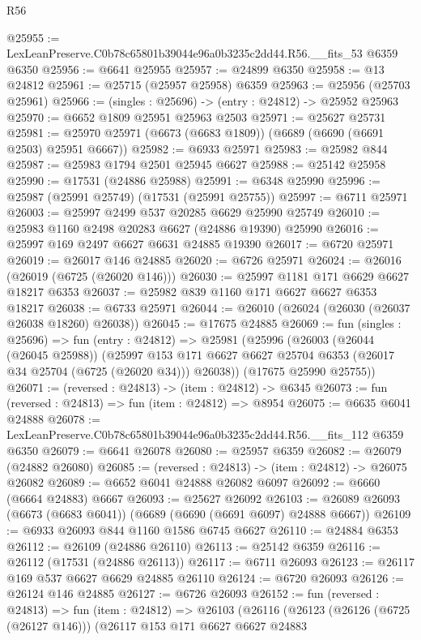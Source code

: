 \begin{lexlean}{R56}
\begin{coremodule}
@25955 := LexLeanPreserve.C0b78c65801b39044e96a0b3235c2dd44.R56.__fits_53 @6359 @6350
@25956 := @6641 @25955
@25957 := @24899 @6350
@25958 := @13 @24812
@25961 := @25715 (@25957 @25958) @6359
@25963 := @25956 (@25703 @25961)
@25966 := (singles : @25696) -> (entry : @24812) -> @25952 @25963
@25970 := @6652 @1809 @25951 @25963 @2503
@25971 := @25627 @25731
@25981 := @25970 @25971 (@6673 (@6683 @1809)) (@6689 (@6690 (@6691 @2503) @25951 @6667))
@25982 := @6933 @25971
@25983 := @25982 @844
@25987 := @25983 @1794 @2501 @25945 @6627
@25988 := @25142 @25958
@25990 := @17531 (@24886 @25988)
@25991 := @6348 @25990
@25996 := @25987 (@25991 @25749) (@17531 (@25991 @25755))
@25997 := @6711 @25971
@26003 := @25997 @2499 @537 @20285 @6629 @25990 @25749
@26010 := @25983 @1160 @2498 @20283 @6627 (@24886 @19390) @25990
@26016 := @25997 @169 @2497 @6627 @6631 @24885 @19390
@26017 := @6720 @25971
@26019 := @26017 @146 @24885
@26020 := @6726 @25971
@26024 := @26016 (@26019 (@6725 (@26020 @146)))
@26030 := @25997 @1181 @171 @6629 @6627 @18217 @6353
@26037 := @25982 @839 @1160 @171 @6627 @6627 @6353 @18217
@26038 := @6733 @25971
@26044 := @26010 (@26024 (@26030 (@26037 @26038 @18260) @26038))
@26045 := @17675 @24885
@26069 := fun (singles : @25696) =>
  fun (entry : @24812) =>
  @25981
    (@25996
      (@26003
        (@26044 (@26045 @25988))
        (@25997 @153 @171 @6627 @6627 @25704 @6353 (@26017 @34 @25704 (@6725 (@26020 @34))) @26038))
      (@17675 @25990 @25755))
@26071 := (reversed : @24813) -> (item : @24812) -> @6345
@26073 := fun (reversed : @24813) => fun (item : @24812) => @8954
@26075 := @6635 @6041 @24888
@26078 := LexLeanPreserve.C0b78c65801b39044e96a0b3235c2dd44.R56.__fits_112 @6359 @6350
@26079 := @6641 @26078
@26080 := @25957 @6359
@26082 := @26079 (@24882 @26080)
@26085 := (reversed : @24813) -> (item : @24812) -> @26075 @26082
@26089 := @6652 @6041 @24888 @26082 @6097
@26092 := @6660 (@6664 @24883) @6667
@26093 := @25627 @26092
@26103 := @26089 @26093 (@6673 (@6683 @6041)) (@6689 (@6690 (@6691 @6097) @24888 @6667))
@26109 := @6933 @26093 @844 @1160 @1586 @6745 @6627
@26110 := @24884 @6353
@26112 := @26109 (@24886 @26110)
@26113 := @25142 @6359
@26116 := @26112 (@17531 (@24886 @26113))
@26117 := @6711 @26093
@26123 := @26117 @169 @537 @6627 @6629 @24885 @26110
@26124 := @6720 @26093
@26126 := @26124 @146 @24885
@26127 := @6726 @26093
@26152 := fun (reversed : @24813) =>
  fun (item : @24812) =>
  @26103
    (@26116
      (@26123
        (@26126 (@6725 (@26127 @146)))
        (@26117
          @153
          @171
          @6627
          @6627
          @24883

\end{coremodule}
\end{lexlean}
